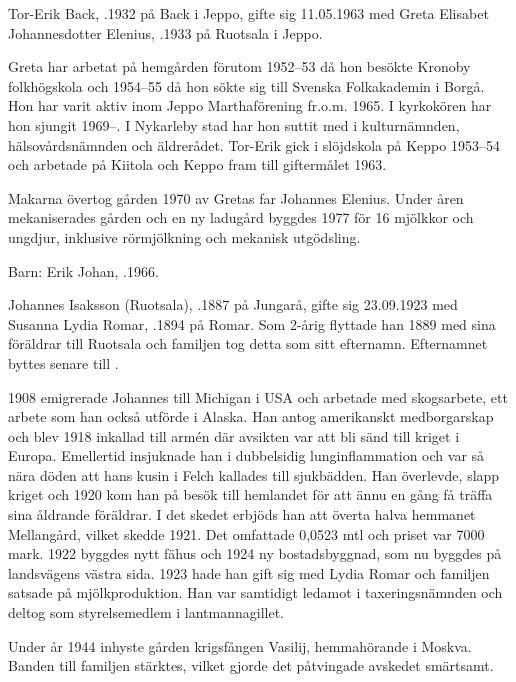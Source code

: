 Tor-Erik Back, .1932 på Back i Jeppo, gifte sig 11.05.1963 med Greta Elisabet Johannesdotter Elenius, .1933 på Ruotsala i Jeppo.

Greta har arbetat på hemgården förutom 1952--53 då hon besökte Kronoby folkhögskola och 1954--55 då hon sökte sig till  Svenska Folkakademin i Borgå. Hon har varit aktiv  inom Jeppo Marthaförening fr.o.m. 1965. I kyrkokören har hon sjungit 1969--. I Nykarleby stad har hon suttit med i kulturnämnden, hälsovårdsnämnden och äldrerådet. Tor-Erik gick i slöjdskola på Keppo 1953--54 och arbetade på Kiitola och Keppo fram till giftermålet 1963.

Makarna övertog gården 1970 av Gretas far Johannes Elenius. Under åren mekaniserades gården och en ny ladugård byggdes 1977 för 16 mjölkkor och ungdjur, inklusive rörmjölkning och mekanisk utgödsling.

Barn:  Erik Johan, .1966.


Johannes Isaksson (Ruotsala), .1887 på Jungarå, gifte sig 23.09.1923 med Susanna Lydia Romar, .1894 på Romar. Som 2-årig flyttade han 1889 med sina föräldrar till Ruotsala och familjen tog detta som sitt efternamn. Efternamnet byttes senare till .

1908 emigrerade Johannes till Michigan i USA och arbetade med skogsarbete, ett arbete som han också utförde i Alaska. Han antog amerikanskt medborgarskap och blev 1918 inkallad till armén där avsikten var att bli sänd till kriget i Europa. Emellertid insjuknade han i dubbelsidig lunginflammation och var så nära döden att hans kusin i Felch kallades till sjukbädden. Han överlevde, slapp kriget och 1920 kom han på besök till hemlandet för att ännu en gång få träffa sina åldrande föräldrar. I det skedet erbjöds han att överta halva hemmanet Mellangård, vilket skedde 1921. Det omfattade 0,0523 mtl och priset var 7000 mark. 1922 byggdes nytt fähus och 1924 ny bostadsbyggnad, som nu byggdes på landsvägens västra sida. 1923 hade han gift sig med Lydia Romar och familjen satsade på mjölkproduktion. Han var samtidigt ledamot i taxeringsnämnden och deltog som styrelsemedlem i lantmannagillet.

Under år 1944 inhyste gården krigsfången Vasilij, hemmahörande i Moskva. Banden till familjen stärktes, vilket gjorde det påtvingade avskedet smärtsamt.

